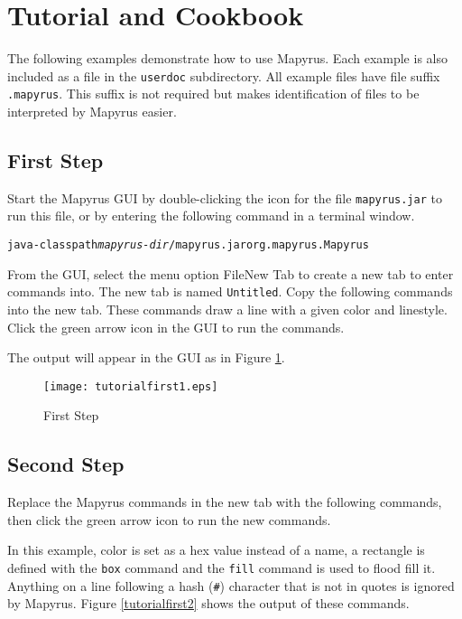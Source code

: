 
\section{Tutorial and Cookbook}

The following examples demonstrate how to use Mapyrus.  Each example is also
included as a file in the \texttt{userdoc} subdirectory.  All example files
have file suffix \texttt{.mapyrus}.  This suffix is not required but makes
identification of files to be interpreted by Mapyrus easier.

\subsection{First Step}

Start the Mapyrus GUI by double-clicking the icon
for the file \texttt{mapyrus.jar} to run this file,
or by entering the following command in a terminal window.

\begin{alltt}
java -classpath \textit{mapyrus-dir}/mapyrus.jar org.mapyrus.Mapyrus
\end{alltt}

From the GUI, select the menu option File\textrightarrow{}New Tab to create a
new tab to enter commands into.
The new tab is named \texttt{Untitled}.
Copy the following commands into the new tab.
These commands draw a line with a given color and linestyle.
Click the green arrow icon in the GUI to run the commands.



The output will appear in the GUI as in Figure \ref{tutorialfirst1}.

\begin{figure}[htb]
\texttt{[image: tutorialfirst1.eps]}
\caption{First Step}
\label{tutorialfirst1}
\end{figure}

\subsection{Second Step}

Replace the Mapyrus commands in the new tab with the following commands,
then click the green arrow icon to run the new commands.



In this example, color is set as a hex value instead of a name,
a rectangle is defined with the \texttt{box} command
and the \texttt{fill} command is used to
flood fill it.
Anything on a line following a hash (\texttt{\#}) character that
is not in quotes is ignored by Mapyrus.
Figure \ref{tutorialfirst2} shows the output of these commands.

